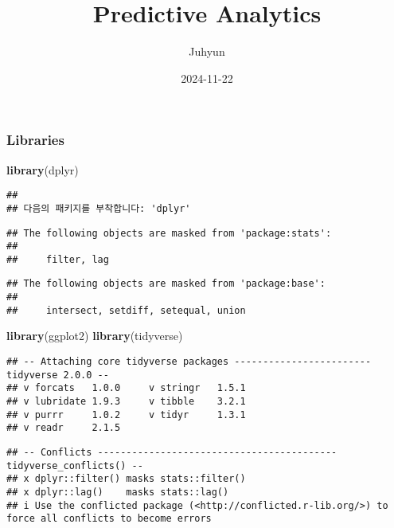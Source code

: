 \documentclass[
]{article}
\title{Predictive Analytics}
\author{Juhyun}
\date{2024-11-22}
\newenvironment{Shaded}{\begin{snugshade}}{\end{snugshade}}
\newcommand{\FunctionTok}[1]{\textcolor[rgb]{0.13,0.29,0.53}{\textbf{#1}}}
\newcommand{\NormalTok}[1]{#1}
\begin{document}
\maketitle

\hypertarget{libraries}{%
\subsubsection{Libraries}\label{libraries}}

\begin{Shaded}
\begin{Highlighting}[]
\FunctionTok{library}\NormalTok{(dplyr)}
\end{Highlighting}
\end{Shaded}

\begin{verbatim}
## 
## 다음의 패키지를 부착합니다: 'dplyr'
\end{verbatim}

\begin{verbatim}
## The following objects are masked from 'package:stats':
## 
##     filter, lag
\end{verbatim}

\begin{verbatim}
## The following objects are masked from 'package:base':
## 
##     intersect, setdiff, setequal, union
\end{verbatim}

\begin{Shaded}
\begin{Highlighting}[]
\FunctionTok{library}\NormalTok{(ggplot2)}
\FunctionTok{library}\NormalTok{(tidyverse)}
\end{Highlighting}
\end{Shaded}

\begin{verbatim}
## -- Attaching core tidyverse packages ------------------------ tidyverse 2.0.0 --
## v forcats   1.0.0     v stringr   1.5.1
## v lubridate 1.9.3     v tibble    3.2.1
## v purrr     1.0.2     v tidyr     1.3.1
## v readr     2.1.5
\end{verbatim}

\begin{verbatim}
## -- Conflicts ------------------------------------------ tidyverse_conflicts() --
## x dplyr::filter() masks stats::filter()
## x dplyr::lag()    masks stats::lag()
## i Use the conflicted package (<http://conflicted.r-lib.org/>) to force all conflicts to become errors
\end{verbatim}
\end{document}
